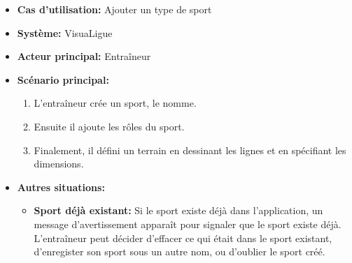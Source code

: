 \begin{itemize}
    \item \textbf{Cas d'utilisation:} Ajouter un type de sport
    \item \textbf{Syst\`eme:} VisuaLigue
    \item \textbf{Acteur principal:} Entra\^ineur
    \item \textbf{Sc\'enario principal:}
        \begin{enumerate}
            \item L'entra\^ineur cr\'ee un sport, le nomme.
            \item Ensuite il ajoute les r\^oles du sport.
            \item Finalement, il d\'efini un terrain en dessinant les lignes et en sp\'ecifiant les dimensions.
        \end{enumerate}
    \item \textbf{Autres situations:}
    \begin{itemize}
        \item \textbf{Sport d\'ej\`a existant:} Si le sport existe d\'ej\`a dans l'application, un message d'avertissement appara\^it pour signaler que le sport existe d\'ej\`a.
        L'entraîneur peut d\'ecider d'effacer ce qui \'etait dans le sport existant, d'enregister son sport sous un autre nom, ou d'oublier le sport cr\'e\'e.
    \end{itemize}
\end{itemize}



